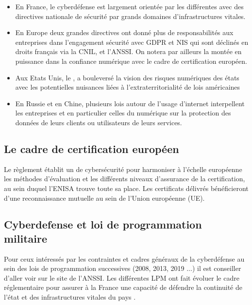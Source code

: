 \begin{itemize}
 \item En France, le cyberdéfense est largement orientée par les différentes  avec des directives nationale de sécurité par grands domaines d'infrastructures vitales.
 \item En Europe deux grandes directives ont donné plus de responsabilités aux entreprises dans l'engagement sécurité avec GDPR et NIS qui sont déclinés en droits français via la CNIL, et l'ANSSI. On notera par ailleurs la montée en puissance dans la confiance numérique avec le cadre de certification européen.
 \item Aux Etats Unis, le , a bouleversé la vision des risques numériques des états avec les potentielles nuisances liées à l'extraterritorialité de lois américaines
 \item En Russie et en Chine, plusieurs lois autour de l'usage d'internet interpellent les entreprises et en particulier celles du numérique sur la protection des données de leurs clients ou utilisateurs de leurs services.
\end{itemize}


\subsection{Le cadre de certification européen}

Le règlement établit un 
 de cybersécurité pour harmoniser à l’échelle européenne les méthodes d’évaluation et les différents niveaux d’assurance de la certification, au sein duquel l’ENISA trouve toute sa place. Les certificats délivrés bénéficieront d’une reconnaissance mutuelle au sein de l’Union européenne (UE). 

\subsection{Cyberdefense et loi de programmation militaire}
Pour ceux intéressés par les contraintes et cadres généraux de la cyberdéfense au sein des lois de programmation successives (2008, 2013, 2019 ...) il est conseiller d'aller voir sur le site de l'ANSSI. Les différentes LPM ont fait évoluer le cadre réglementaire pour assurer à la France une capacité de défendre la continuité de l'état et des infrastructures vitales du pays .
